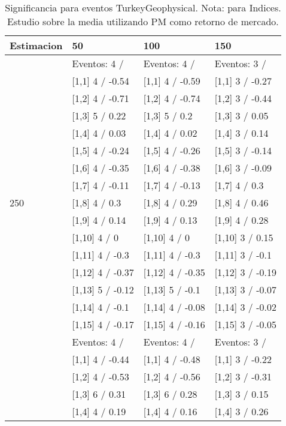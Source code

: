 \begin{table}

\caption{Significancia para eventos TurkeyGeophysical. Nota: para Indices. Estudio sobre la media utilizando PM como retorno de mercado.}
\centering
\begin{tabular}[t]{llll}
\toprule
Estimacion & 50 & 100 & 150\\
\midrule
 & Eventos:  4 / & Eventos:  4 / & Eventos:  3 /\\
 & {}[1,1] 4  / -0.54 & {}[1,1] 4  / -0.59 & {}[1,1] 3  / -0.27\\
 & {}[1,2] 4  / -0.71 & {}[1,2] 4  / -0.74 & {}[1,2] 3  / -0.44\\
 & {}[1,3] 5  / 0.22 & {}[1,3] 5  / 0.2 & {}[1,3] 3  / 0.05\\
 & {}[1,4] 4  / 0.03 & {}[1,4] 4  / 0.02 & {}[1,4] 3  / 0.14\\
\addlinespace
 & {}[1,5] 4  / -0.24 & {}[1,5] 4  / -0.26 & {}[1,5] 3  / -0.14\\
 & {}[1,6] 4  / -0.35 & {}[1,6] 4  / -0.38 & {}[1,6] 3  / -0.09\\
 & {}[1,7] 4  / -0.11 & {}[1,7] 4  / -0.13 & {}[1,7] 4  / 0.3\\
250 & {}[1,8] 4  / 0.3 & {}[1,8] 4  / 0.29 & {}[1,8] 4  / 0.46\\
 & {}[1,9] 4  / 0.14 & {}[1,9] 4  / 0.13 & {}[1,9] 4  / 0.28\\
\addlinespace
 & {}[1,10] 4  / 0 & {}[1,10] 4  / 0 & {}[1,10] 3  / 0.15\\
 & {}[1,11] 4  / -0.3 & {}[1,11] 4  / -0.3 & {}[1,11] 3  / -0.1\\
 & {}[1,12] 4  / -0.37 & {}[1,12] 4  / -0.35 & {}[1,12] 3  / -0.19\\
 & {}[1,13] 5  / -0.12 & {}[1,13] 5  / -0.1 & {}[1,13] 3  / -0.07\\
 & {}[1,14] 4  / -0.1 & {}[1,14] 4  / -0.08 & {}[1,14] 3  / -0.02\\
\addlinespace
 & {}[1,15] 4  / -0.17 & {}[1,15] 4  / -0.16 & {}[1,15] 3  / -0.05\\
 & Eventos:  4 / & Eventos:  4 / & Eventos:  3 /\\
 & {}[1,1] 4  / -0.44 & {}[1,1] 4  / -0.48 & {}[1,1] 3  / -0.22\\
 & {}[1,2] 4  / -0.53 & {}[1,2] 4  / -0.56 & {}[1,2] 3  / -0.31\\
 & {}[1,3] 6  / 0.31 & {}[1,3] 6  / 0.28 & {}[1,3] 3  / 0.15\\
\addlinespace
 & {}[1,4] 4  / 0.19 & {}[1,4] 4  / 0.16 & {}[1,4] 3  / 0.26\\

\end{tabular}
\end{table}
